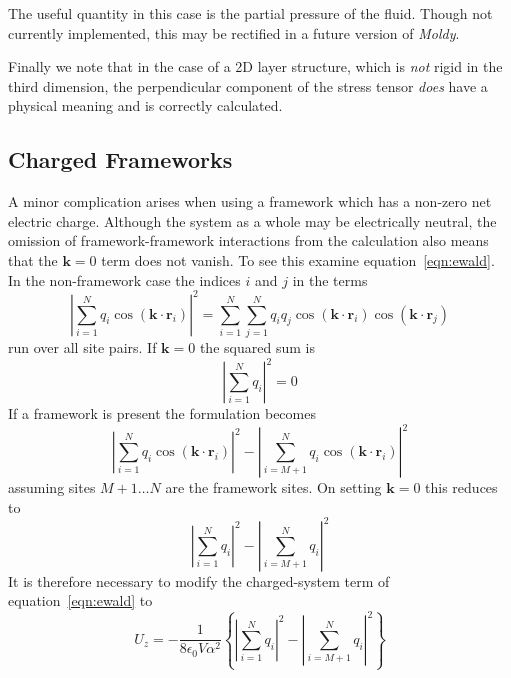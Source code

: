 \documentclass[a4paper,twoside]{report}
\providecommand{\bm}[1]{\mathbf{#1}}
\newcommand{\moldy}{\emph{Moldy}}
\begin{document}
The useful quantity in this case is the partial pressure of the
fluid.  Though not currently implemented, this may be rectified in a
future version of \moldy.

Finally we note that in the case of a 2D layer structure, which is
\emph{not} rigid in the third dimension, the perpendicular component of
the stress tensor \emph{does} have a physical meaning and is correctly
calculated. 
 
\subsection{Charged Frameworks}
A minor complication arises when using a framework which has a
non-zero net electric charge.  Although the system as a whole may be
electrically neutral, the omission of  framework-framework
interactions from the calculation also means that the
$\bm{k}=0$ term does not vanish.  To see this examine
equation~\ref{eqn:ewald}.  In the non-framework case the indices $i$
and $j$ in the terms
\begin{displaymath}
\left | \sum_{i=1}^{N} q_i \cos(\bm{k \cdot r}_i) \right |^2 
  = \sum_{i=1}^{N} \sum_{j=1}^{N} q_i q_j 
    \cos(\bm{k \cdot r}_i)\cos(\bm{k \cdot r}_j) 
\end{displaymath}
run over all site pairs.  If $\bm{k}=0$
the squared sum is 
\begin{displaymath}
\left | \sum_{i=1}^{N} q_i \right |^2 = 0
\end{displaymath}
If a framework is present the formulation becomes
\begin{displaymath}
\left | \sum_{i=1}^{N} q_i \cos(\bm{k \cdot r}_i) \right |^2 
-
\left | \sum_{i=M\!+\!1}^{N} q_i \cos(\bm{k \cdot r}_i) \right |^2 
\end{displaymath}
assuming sites $M+1 \ldots N$ are the framework sites.  On setting
$\bm{k}=0$ this reduces to
\begin{displaymath}
\left | \sum_{i=1}^N q_i \right |^2 - \left | \sum_{i=M\!+\!1}^N q_i \right |^2
\end{displaymath}
It is therefore necessary to modify the charged-system term of
equation~\ref{eqn:ewald} to
\begin{equation}
U_z = - \frac{1}{8 \epsilon_0 V \alpha^2}
\left \lbrace
\left | \sum_{i=1}^N q_i \right |^2 - \left | \sum_{i=M\!+\!1}^N q_i \right |^2
\right \rbrace
\end{equation}
\end{document}
